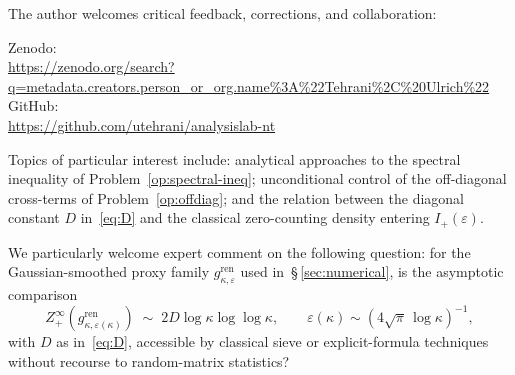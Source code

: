 \documentclass[11pt]{article}
\begin{document}
The author welcomes critical feedback, corrections, and
collaboration:

{\raggedright
Zenodo:\\
\url{https://zenodo.org/search?q=metadata.creators.person_or_org.name\%3A\%22Tehrani\%2C\%20Ulrich\%22}\\
GitHub:\\
\url{https://github.com/utehrani/analysislab-nt}
\par}

Topics of particular interest include: analytical approaches to
the spectral inequality of Problem~\ref{op:spectral-ineq};
unconditional control of the off-diagonal cross-terms of
Problem~\ref{op:offdiag}; and the relation between the diagonal
constant $D$ in~\eqref{eq:D} and the classical zero-counting
density entering $I_+(\varepsilon)$.

We particularly welcome expert comment on the following
question: for the Gaussian-smoothed proxy family
$g^{\mathrm{ren}}_{\kappa,\varepsilon}$ used
in~\S\,\ref{sec:numerical},
is the asymptotic comparison
\[
Z_+^{\infty}(g^{\mathrm{ren}}_{\kappa,\varepsilon(\kappa)})
\;\sim\; 2D\log\kappa\log\log\kappa,
\qquad
\varepsilon(\kappa)\sim (4\sqrt\pi\,\log\kappa)^{-1},
\]
with $D$ as in~\eqref{eq:D}, accessible by classical sieve or
explicit-formula techniques without recourse to random-matrix
statistics?
\end{document}
